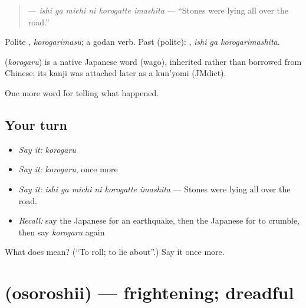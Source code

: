 \begin{quote}
\textbf{  } — \emph{ishi ga michi ni korogatte imashita} — \textquotedblleft{}Stones were lying all over the road.\textquotedblright{}
\end{quote}

Polite \textbf{}, \emph{korogarimasu}; a godan verb. Past (polite): \textbf{ }, \emph{ishi ga korogarimashita}.

\begin{cousinweb}
\textbf{} (\emph{korogaru}) is a native Japanese word (wago), inherited rather than borrowed from Chinese; its kanji was attached later as a kun'yomi (JMdict).
\end{cousinweb}

\begin{grammarlens}[title={What you've built}]
One more word for telling what happened.
\end{grammarlens}

\subsection*{Your turn}
\begin{itemize}
\raggedright
  \item \emph{Say it:} \emph{korogaru}
  \item \emph{Say it:} \emph{korogaru}, once more
  \item \emph{Say it:} \emph{ishi ga michi ni korogatte imashita} — Stones were lying all over the road.
  \item \emph{Recall:} say the Japanese for an earthquake, then the Japanese for to crumble, then say \emph{korogaru} again
\end{itemize}

\begin{tcolorbox}[breakable,colback=teal!4,colframe=teal!35!black,title={Before you move on}]
What does  mean? (\textquotedblleft{}To roll; to lie about\textquotedblright{}.) Say it once more.
\end{tcolorbox}
\section[\texorpdfstring{\ja{おそろしい} (osoroshii)}{おそろしい (osoroshii)}]{ (osoroshii) — frightening; dreadful}

\label{lesson:JA-C274-osoroshii}



